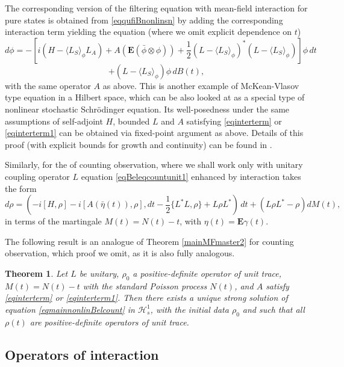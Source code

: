 \documentclass[12pt]{article}
\def\HC{\mathcal{H}}
\def\E{\mathbf{E}}
\def\ga{\gamma}
\newtheorem{theorem}{Theorem}[section]
\begin{document}
The corresponding version of the filtering equation with mean-field interaction for pure states
is obtained from \eqref{eqqufiBnonlinsn} by adding the corresponding interaction term yielding the equation
(where we omit explicit dependence on $t$)
\[
d\phi=-[i(H-\langle L_S \rangle_{\phi} L_A)+A(\E (\bar \phi \otimes \phi))
+\frac12 (L-\langle L_S \rangle_{\phi})^*(L-\langle L_S \rangle_{\phi})]\phi \, dt
\]
\begin{equation}
\label{eqmainnonlinBelpu}
+ (L-\langle L_S \rangle_{\phi})\phi \, dB(t),
\end{equation}
with the same operator $A$ as above. This is another example of McKean-Vlasov type equation in a Hilbert space,
which can be also looked at as a special type of nonlinear stochastic Schr\"odinger equation.
Its well-posedness under the same assumptions of self-adjoint $H$, bounded $L$ and $A$ satisfying
\eqref{eqinterterm} or \eqref{eqinterterm1} can be obtained via fixed-point argument as above.
Details of this proof (with explicit bounds for growth and continuity) can be found in \cite{KolQuantLLN}.


Similarly, for the of counting observation, where we shall work only with unitary coupling operator $L$
equation  \eqref{eqBeleqcountunit1} enhanced by interaction takes the form
 \begin{equation}
\label{eqmainnonlinBelcount}
d\rho=(- i[H, \rho]  -i[A(\bar \eta(t)), \rho] , dt -\frac12 \{L^*L,\rho\}+ L\rho L^* ) \, dt
+\left(L\rho L^*-\rho\right) dM(t),
\end{equation}
in terms of the martingale $M(t)=N(t)-t$,  with $\eta(t) =\E \ga(t)$.

The following result is an analogue of Theorem \ref{mainMFmaster2} for counting observation,
which proof we omit, as it is also fully analogous.

 \begin{theorem}
\label{mainMFmaster3}
Let $L$ be unitary, $\rho_0$ a positive-definite operator of unit trace,
 $M(t)=N(t)-t$ with the standard Poisson process $N(t)$, and $A$ satisfy \eqref{eqinterterm} or \eqref{eqinterterm1}.
Then there exists a unique strong solution of equation \eqref{eqmainnonlinBelcount}
in $\HC^1_s$, with the initial data $\rho_0$
and such that all $\rho(t)$ are positive-definite operators of unit trace.
\end{theorem}

\subsection{Operators of interaction}
\end{document}

